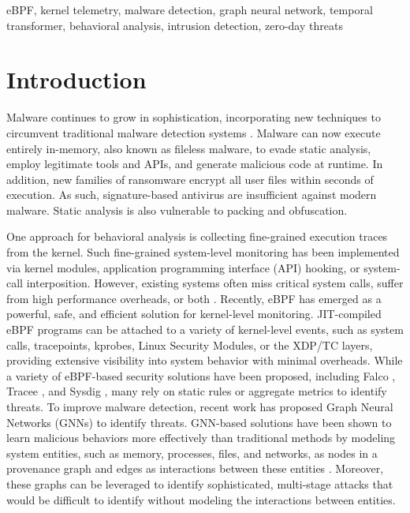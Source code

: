 \documentclass[conference]{IEEEtran}
\begin{document}
\begin{IEEEkeywords}
eBPF, kernel telemetry, malware detection, graph neural network, temporal transformer, behavioral analysis, intrusion detection, zero-day threats
\end{IEEEkeywords}

\section{Introduction}
Malware continues to grow in sophistication, incorporating new techniques to circumvent traditional malware detection systems \cite{or2019dynamic,ucci2019survey}. Malware can now execute entirely in-memory, also known as fileless malware, to evade static analysis, employ legitimate tools and APIs, and generate malicious code at runtime. In addition, new families of ransomware \cite{scaife2016cryptolock,continella2016shieldfs} encrypt all user files within seconds of execution. As such, signature-based antivirus \cite{clamav2020} are insufficient against modern malware. Static analysis \cite{rieck2011automatic} is also vulnerable to packing and obfuscation.

One approach for behavioral analysis is collecting fine-grained execution traces from the kernel. Such fine-grained system-level monitoring has been implemented via kernel modules, application programming interface (API) hooking, or system-call interposition. However, existing systems often miss critical system calls, suffer from high performance overheads, or both \cite{auditd2018,king2003backtracking,nguyen2021rootkit}. Recently, eBPF has emerged as a powerful, safe, and efficient solution for kernel-level monitoring. JIT-compiled eBPF programs can be attached to a variety of kernel-level events, such as system calls, tracepoints, kprobes, Linux Security Modules, or the XDP/TC layers, providing extensive visibility into system behavior with minimal overheads. While a variety of eBPF-based security solutions have been proposed, including Falco \cite{falco2020}, Tracee \cite{tracee2021}, and Sysdig \cite{sysdig2021}, many rely on static rules or aggregate metrics to identify threats. To improve malware detection, recent work has proposed Graph Neural Networks (GNNs) to identify threats. GNN-based solutions have been shown to learn malicious behaviors more effectively than traditional methods by modeling system entities, such as memory, processes, files, and networks, as nodes in a provenance graph \cite{han2020unicorn} and edges as interactions between these entities \cite{milajerdi2019holmes,cheng2023kairos}. Moreover, these graphs can be leveraged to identify sophisticated, multi-stage attacks that would be difficult to identify without modeling the interactions between entities.
\end{document}

